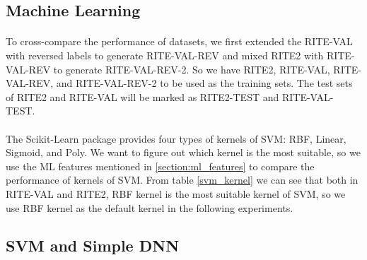 \documentclass{article}
\begin{document}
\begin{CJK*}{UTF8}{bkai}
\subsection{Machine Learning}
\paragraph{}
To cross-compare the performance of datasets, we first extended the RITE-VAL with reversed labels to generate RITE-VAL-REV and mixed RITE2 with RITE-VAL-REV to generate RITE-VAL-REV-2. So we have RITE2, RITE-VAL, RITE-VAL-REV, and RITE-VAL-REV-2 to be used as the training sets. The test sets of RITE2 and RITE-VAL will be marked as RITE2-TEST and RITE-VAL-TEST.

\paragraph{}
The Scikit-Learn package provides four types of kernels of SVM: RBF, Linear, Sigmoid, and Poly. We want to figure out which kernel is the most suitable, so we use the ML features mentioned in \ref{section:ml_features} to compare the performance of kernels of SVM. From table \ref{svm_kernel} we can see that both in RITE-VAL and RITE2, RBF kernel is the most suitable kernel of SVM, so we use RBF kernel as the default kernel in the following experiments.

\subsection{SVM and Simple DNN}

\end{CJK*}
\end{document}
